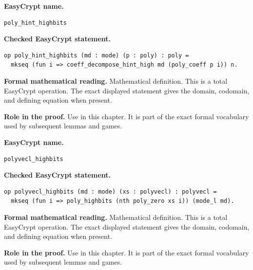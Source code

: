 \begin{formaldefinition}
\noindent\textbf{EasyCrypt name.}
\begin{lstlisting}[language=EasyCrypt,basicstyle=\ttfamily\scriptsize]
poly_hint_highbits
\end{lstlisting}
\noindent\textbf{Checked EasyCrypt statement.}
\begin{lstlisting}[language=EasyCrypt,basicstyle=\ttfamily\scriptsize]
op poly_hint_highbits (md : mode) (p : poly) : poly =
  mkseq (fun i => coeff_decompose_hint_high md (poly_coeff p i)) n.
\end{lstlisting}
\noindent\textbf{Formal mathematical reading.}
Mathematical definition. This is a total EasyCrypt operation.  The exact displayed statement gives the domain, codomain, and defining equation when present.

\noindent\textbf{Role in the proof.}
Use in this chapter. It is part of the exact formal vocabulary used by subsequent lemmas and games.

\end{formaldefinition}

\begin{formaldefinition}
\noindent\textbf{EasyCrypt name.}
\begin{lstlisting}[language=EasyCrypt,basicstyle=\ttfamily\scriptsize]
polyvecl_highbits
\end{lstlisting}
\noindent\textbf{Checked EasyCrypt statement.}
\begin{lstlisting}[language=EasyCrypt,basicstyle=\ttfamily\scriptsize]
op polyvecl_highbits (md : mode) (xs : polyvecl) : polyvecl =
  mkseq (fun i => poly_highbits (nth poly_zero xs i)) (mode_l md).
\end{lstlisting}
\noindent\textbf{Formal mathematical reading.}
Mathematical definition. This is a total EasyCrypt operation.  The exact displayed statement gives the domain, codomain, and defining equation when present.

\noindent\textbf{Role in the proof.}
Use in this chapter. It is part of the exact formal vocabulary used by subsequent lemmas and games.

\end{formaldefinition}

